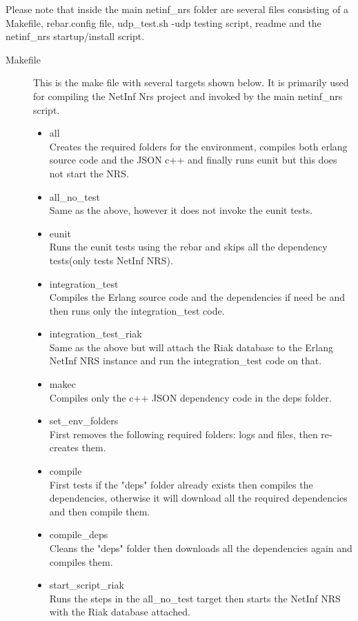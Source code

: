 Please note that inside the main netinf\_nrs folder are several files consisting of a Makefile, rebar.config file, udp\_test.sh -udp 
testing script, readme and the netinf\_nrs startup/install script. 

\begin{description}
\item[Makefile]
This is the make file with several targets shown below. It is primarily used for compiling the NetInf Nrs project and invoked by the 
main netinf\_nrs script. 
\begin{itemize}
\item all \\
Creates the required folders for the environment, compiles both erlang source code and the JSON c++ and finally runs eunit but this 
does not start the NRS.
\item all\_no\_test \\
Same as the above, however it does not invoke the eunit tests.
\item eunit \\
Runs the eunit tests using the rebar and skips all the dependency tests(only tests NetInf NRS).
\item integration\_test \\
Compiles the Erlang source code and the dependencies if need be and then runs only the integration\_test code.
\item integration\_test\_riak \\
Same as the above but will attach the Riak database to the Erlang NetInf NRS instance and run the integration\_test code on that.
\item makec \\
Compiles only the c++ JSON dependency code in the deps folder. 
\item set\_env\_folders \\
First removes the following  required folders: logs and files, then re-creates them.
\item compile \\
First tests if the "deps" folder already exists then compiles the dependencies, otherwise it will download all the required dependencies 
and then compile them.
\item compile\_deps \\
Cleans the "deps" folder then downloads all the dependencies again and compiles them.
\item start\_script\_riak \\
Runs the steps in the all\_no\_test target then starts the NetInf NRS with the Riak database attached.

\end{itemize}
\end{description}
